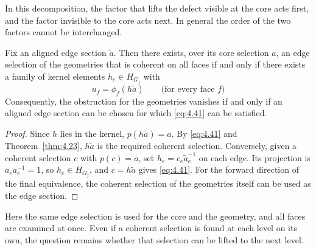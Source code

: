 In this decomposition, the factor that lifts the defect visible at the core acts first,
and the factor invisible to the core acts next.
In general the order of the two factors cannot be interchanged.

\begin{theorem}\label{thm:4.34}

Fix an aligned edge section $\widetilde a$.
Then there exists, over its core selection $a$, an edge selection of the geometries that
is coherent on all faces if and only if there exists a family of kernel elements
$h_e\in H_{G_j}$ with
\begin{equation*}
u_f=\phi_f(h\widetilde a)\qquad\text{(for every face }f\text{)}
\tag{4.41}\label{eq:4.41}
\end{equation*}
Consequently, the obstruction for the geometries vanishes if and only if an aligned edge
section can be chosen for which \eqref{eq:4.41} can be satisfied.

\end{theorem}

\begin{proof}

Since $h$ lies in the kernel, $p(h\widetilde a)=a$.
By \eqref{eq:4.41} and Theorem~\ref{thm:4.23}, $h\widetilde a$ is the
required coherent selection.
Conversely, given a coherent selection $c$ with $p(c)=a$, set
$h_e=c_e\widetilde a_e^{-1}$ on each edge.
Its projection is $a_ea_e^{-1}=1$, so $h_e\in H_{G_j}$, and
$c=h\widetilde a$ gives \eqref{eq:4.41}.
For the forward direction of the final equivalence, the coherent selection of the
geometries itself can be used as the edge section.

\end{proof}

Here the same edge selection is used for the core and the geometry, and all faces are
examined at once.
Even if a coherent selection is found at each level on its own, the question remains whether
that selection can be lifted to the next level.

